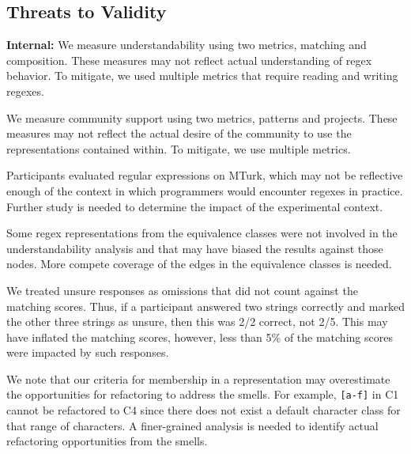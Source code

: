 \subsection{Threats to Validity}

\textbf{Internal:}
We measure understandability  using two metrics, matching and composition. These measures may not reflect actual understanding of regex behavior. To mitigate, we used multiple metrics that require reading and writing regexes. %

We measure community support using two metrics, patterns and projects. These measures may not reflect the actual  desire of the community to use the representations  contained within. To mitigate, we use multiple metrics. 

Participants evaluated regular expressions  on MTurk, which may not be reflective enough of the context in which programmers would encounter regexes in practice. Further study is needed to determine the impact of the experimental context. 

Some regex representations from the equivalence classes were not involved in the understandability analysis and that may have biased the results against those nodes. 
More compete coverage of the edges in the equivalence classes is needed.

We treated unsure responses as omissions that  did not count  against the matching scores. Thus, if a participant answered two strings correctly and marked the other three strings as unsure, then this was 2/2 correct, not 2/5. This may have inflated the matching scores, however, less than 5\% of the matching scores were impacted by such responses.

We note that our criteria for membership in a representation may overestimate the opportunities for refactoring to address the smells. For example, \verb![a-f]! in C1 cannot be refactored to C4 since there does not exist a default character class for that range of characters. A finer-grained analysis is needed to identify actual refactoring opportunities from the smells.


%

